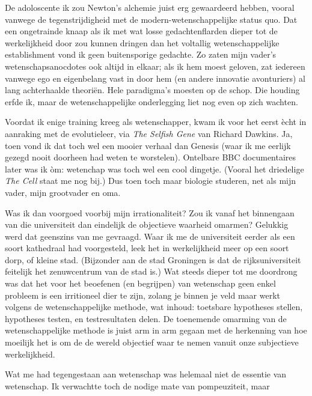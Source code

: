 \documentclass[12pt,a4paper]{article}
\begin{document}
De adoloscente ik zou Newton's alchemie juist erg gewaardeerd hebben, vooral vanwege de tegenstrijdigheid met de modern-wetenschappelijke status quo. Dat een ongetrainde knaap als ik met wat losse gedachtenflarden dieper tot de werkelijkheid door zou kunnen dringen dan het voltallig wetenschappelijke establishment vond ik geen buitensporige gedachte. Zo zaten mijn vader's wetenschapsanocdotes ook altijd in elkaar; als ik hem moest geloven, zat iedereen vanwege ego en eigenbelang vast in door hem (en andere innovatie avonturiers) al lang achterhaalde theoriën. Hele paradigma's moesten op de schop. Die houding erfde ik, maar de wetenschappelijke onderlegging liet nog even op zich wachten.

Voordat ik enige training kreeg als wetenschapper, kwam ik voor het eerst ècht in aanraking met de evolutieleer, via \emph{The Selfish Gene} van Richard Dawkins. Ja, toen vond ik dat toch wel een mooier verhaal dan Genesis (waar ik me eerlijk gezegd nooit doorheen had weten te worstelen). Ontelbare BBC documentaires later was ik òm: wetenchap was toch wel een cool dingetje. (Vooral het driedelige \emph{The Cell} staat me nog bij.) Dus toen toch maar biologie studeren, net als mijn vader, mijn grootvader en oma.

Was ik dan voorgoed voorbij mijn irrationaliteit? Zou ik vanaf het binnengaan van die universiteit dan eindelijk de objectieve waarheid omarmen? Gelukkig werd dat geenszins van me gevraagd. Waar ik me de universiteit eerder als een soort kathedraal had voorgesteld, leek het in werkelijkheid meer op een soort dorp, of kleine stad. (Bijzonder aan de stad Groningen is dat de rijksuniversiteit feitelijk het zenuwcentrum van de stad is.) Wat steeds dieper tot me doordrong was dat het voor het beoefenen (en begrijpen) van wetenschap geen enkel probleem is een irritioneel dier te zijn, zolang je binnen je veld maar werkt volgens de wetenschappelijke methode, wat inhoud: toetsbare hypotheses stellen, hypotheses testen, en testresultaten delen. De toenemende omarming van de wetenschappelijke methode is juist arm in arm gegaan met de herkenning van hoe moeilijk het is om de de wereld objectief waar te nemen vanuit onze subjectieve werkelijkheid.

Wat me had tegengestaan aan wetenschap was helemaal niet de essentie van wetenschap. Ik verwachtte toch de nodige mate van pompeuziteit, maar 

\end{document}
